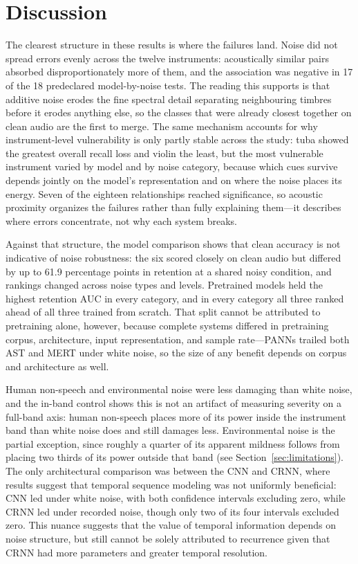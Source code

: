 \documentclass[conference]{IEEEtran}
\begin{document}
\section{Discussion}
The clearest structure in these results is where the failures land. Noise did not spread errors evenly across the twelve instruments: acoustically similar pairs absorbed disproportionately more of them, and the association was negative in 17 of the 18 predeclared model-by-noise tests. The reading this supports is that additive noise erodes the fine spectral detail separating neighbouring timbres before it erodes anything else, so the classes that were already closest together on clean audio are the first to merge. The same mechanism accounts for why instrument-level vulnerability is only partly stable across the study: tuba showed the greatest overall recall loss and violin the least, but the most vulnerable instrument varied by model and by noise category, because which cues survive depends jointly on the model's representation and on where the noise places its energy. Seven of the eighteen relationships reached significance, so acoustic proximity organizes the failures rather than fully explaining them---it describes where errors concentrate, not why each system breaks.

Against that structure, the model comparison shows that clean accuracy is not indicative of noise robustness: the six scored closely on clean audio but differed by up to 61.9 percentage points in retention at a shared noisy condition, and rankings changed across noise types and levels. Pretrained models held the highest retention AUC in every category, and in every category all three ranked ahead of all three trained from scratch. That split cannot be attributed to pretraining alone, however, because complete systems differed in pretraining corpus, architecture, input representation, and sample rate---PANNs trailed both AST and MERT under white noise, so the size of any benefit depends on corpus and architecture as well.

Human non-speech and environmental noise were less damaging than white noise, and the in-band control shows this is not an artifact of measuring severity on a full-band axis: human non-speech places more of its power inside the instrument band than white noise does and still damages less. Environmental noise is the partial exception, since roughly a quarter of its apparent mildness follows from placing two thirds of its power outside that band (see Section~\ref{sec:limitations}). The only architectural comparison was between the CNN and CRNN, where results suggest that temporal sequence modeling was not uniformly beneficial: CNN led under white noise, with both confidence intervals excluding zero, while CRNN led under recorded noise, though only two of its four intervals excluded zero. This nuance suggests that the value of temporal information depends on noise structure, but still cannot be solely attributed to recurrence given that CRNN had more parameters and greater temporal resolution.
\end{document}
